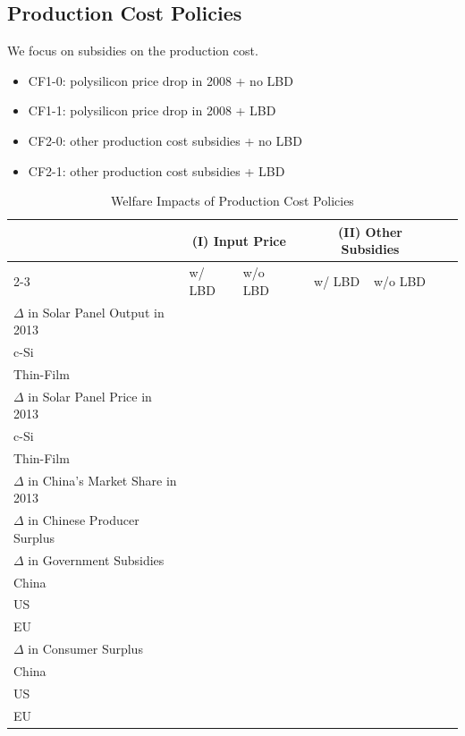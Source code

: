 \documentclass[12pt, letter]{article}
\begin{document}
\subsection{Production Cost Policies}
\label{subsec:cf_production}
We focus on subsidies on the production cost.
\begin{itemize}
    \item CF1-0: polysilicon price drop in 2008 + no LBD
    \item CF1-1: polysilicon price drop in 2008 + LBD
    \item CF2-0: other production cost subsidies + no LBD
    \item CF2-1: other production cost subsidies + LBD
\end{itemize} 

\begin{table}[tbh]
\centering
\caption{Welfare Impacts of Production Cost Policies}
\label{tab:cf_production_policy}
\begin{threeparttable}
\begin{tabularx}{1.0\textwidth}{Xlllllll}
\toprule
 & \multicolumn{2}{c}{(I) Input Price} && \multicolumn{2}{c}{(II) Other Subsidies } \\
\cmidrule{2-3} \cmidrule{5-6}
 & w/ LBD & w/o LBD && w/ LBD & w/o LBD \\
\midrule
$\Delta$ in Solar Panel Output in 2013 &  &  &&  &  \\
\quad\quad c-Si &  &  &&  &  \\
\quad\quad Thin-Film &  &  &&  &  \\
$\Delta$ in Solar Panel Price in 2013 &  &  &&  &  \\
\quad\quad c-Si &  &  &&  &  \\
\quad\quad Thin-Film &  &  &&  &  \\
$\Delta$ in China's Market Share in 2013 &  &  &&  &  \\
$\Delta$ in Chinese Producer Surplus &  &  &&  &  \\
$\Delta$ in Government Subsidies &  &  &&  &  \\
\quad\quad China &  &  &&  &  \\
\quad\quad US &  &  &&  &  \\
\quad\quad EU &  &  &&  &  \\
$\Delta$ in Consumer Surplus &  &  &&  &  \\
\quad\quad China &  &  &&  &  \\
\quad\quad US &  &  &&  &  \\
\quad\quad EU &  &  &&  &  \\

\end{tabularx}
\end{threeparttable}
\end{table}
\end{document}
